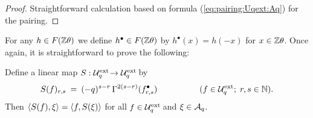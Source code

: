 \begin{proof}
  Straightforward calculation based on formula (\ref{eq:pairing:Uqext:Aq}) for the pairing.
\end{proof}
\vspace{2ex}



For any $h \in F(\mathbb{Z} \theta)$ we define $h^\bullet \in F(\mathbb{Z} \theta)$ by
$h^\bullet(x) = h(-x)$ for $x \in \mathbb{Z} \theta$. Once again, it is
straightforward to prove the following:

\begin{prop} \label{prop:Uqext:antipode}
  Define a linear map\/ $S : {\mathcal U}_q^{\rm ext}\! \rightarrow {\mathcal U}_q^{\rm ext}\! $ by
  $$ S(f)_{r,s} \:=\: (-q)^{s-r} \,\Gamma^{2(s-r)}(f_{r,s}^\bullet)
               \hspace{5em}
     (f \in {\mathcal U}_q^{\rm ext}\!\,;\;r,s \in \mathbb{N}). $$
  Then\/ $\langle S(f),\xi \rangle = \langle f,S(\xi) \rangle$ for all\/ $f \in {\mathcal U}_q^{\rm ext}\!$ and\/ $\xi \in {\mathcal A}_q$.
\end{prop}
